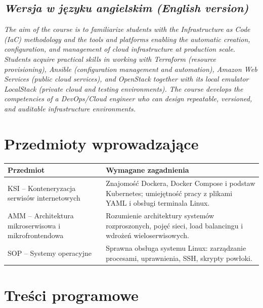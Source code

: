 \documentclass[12pt, a4paper]{article}
\newcommand{\thdrule}{\noalign{\global\setlength{\extrarowheight}{0pt}}}
\newcommand{\thdend}{\noalign{\global\setlength{\extrarowheight}{3pt}}}
\begin{document}
\subsection*{\textit{Wersja w języku angielskim (English version)}}

\textit{The aim of the course is to familiarize students with the Infrastructure as Code (IaC) methodology and the tools and platforms enabling the automatic creation, configuration, and management of cloud infrastructure at production scale. Students acquire practical skills in working with Terraform (resource provisioning), Ansible (configuration management and automation), Amazon Web Services (public cloud services), and OpenStack together with its local emulator LocalStack (private cloud and testing environments). The course develops the competencies of a DevOps/Cloud engineer who can design repeatable, versioned, and auditable infrastructure environments.}


\section{Przedmioty wprowadzające}

{\scriptsize
\begin{tabularx}{\textwidth}{m{5cm}Y}
\thdrule\toprule
{} {\color{white}\textbf{Przedmiot}} & {\color{white}\textbf{Wymagane zagadnienia}} \\
\midrule\thdend
   KSI – Konteneryzacja serwisów internetowych & Znajomość Dockera, Docker Compose i podstaw Kubernetes; umiejętność pracy z plikami YAML i obsługi terminala Linux. \\
   AMM – Architektura mikroserwisowa i mikrofrontendowa & Rozumienie architektury systemów rozproszonych, pojęć sieci, load balancingu i wdrożeń wieloserwisowych. \\
   SOP – Systemy operacyjne & Sprawna obsługa systemu Linux: zarządzanie procesami, uprawnienia, SSH, skrypty powłoki. \\
\bottomrule
\end{tabularx}}

\section{Treści programowe}
\end{document}
